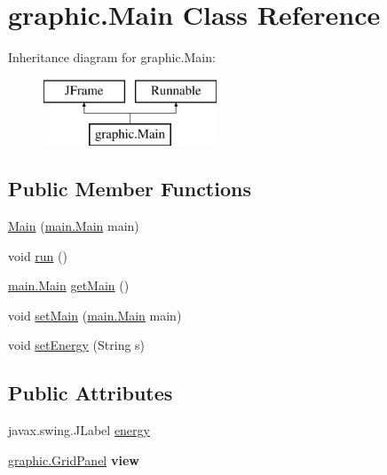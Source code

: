 \hypertarget{classgraphic_1_1_main}{}\section{graphic.\+Main Class Reference}
\label{classgraphic_1_1_main}
Inheritance diagram for graphic.\+Main\+:\begin{figure}[H]
\begin{center}
\leavevmode
\includegraphics[height=2.000000cm]{classgraphic_1_1_main}
\end{center}
\end{figure}
\subsection*{Public Member Functions}
\begin{DoxyCompactItemize}
\item 
\hyperlink{classgraphic_1_1_main_accc0905da50b389894edb0d06c74d729}{Main} (\hyperlink{classmain_1_1_main}{main.\+Main} main)
\item 
void \hyperlink{classgraphic_1_1_main_a0d2917dabb35ec2691d660a20a663139}{run} ()
\item 
\hyperlink{classmain_1_1_main}{main.\+Main} \hyperlink{classgraphic_1_1_main_a301b089a02920c585b50d06ff024b145}{get\+Main} ()
\item 
void \hyperlink{classgraphic_1_1_main_ad5a607609bf30c7d09d3340c118b4c57}{set\+Main} (\hyperlink{classmain_1_1_main}{main.\+Main} main)
\item 
void \hyperlink{classgraphic_1_1_main_a4c7ddcd2bfc33ac56722e7f6970afbc2}{set\+Energy} (String s)
\end{DoxyCompactItemize}
\subsection*{Public Attributes}
\begin{DoxyCompactItemize}
\item 
javax.\+swing.\+J\+Label \hyperlink{classgraphic_1_1_main_a07b285e66d82f1f90d94a7c61ad939a1}{energy}
\item 
\hypertarget{classgraphic_1_1_main_ac3aa555569610334ab1babed0b83b5c7}{}\label{classgraphic_1_1_main_ac3aa555569610334ab1babed0b83b5c7} 
\hyperlink{classgraphic_1_1_grid_panel}{graphic.\+Grid\+Panel} {\bfseries view}
\end{DoxyCompactItemize}


